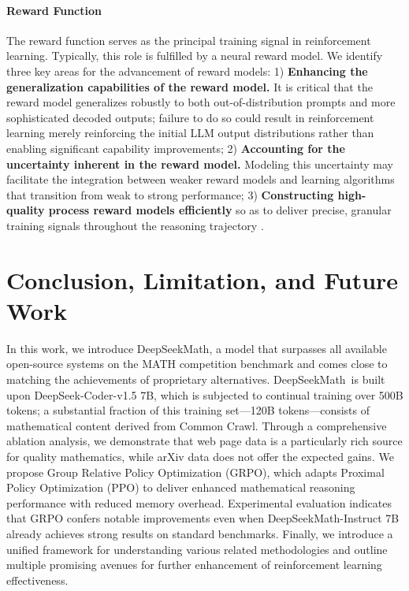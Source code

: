 \begin{itemize}[topsep=0pt]
\paragraph{Reward Function} The reward function serves as the principal training signal in reinforcement learning. Typically, this role is fulfilled by a neural reward model. We identify three key areas for the advancement of reward models: 1) \textbf{Enhancing the generalization capabilities of the reward model.} It is critical that the reward model generalizes robustly to both out-of-distribution prompts and more sophisticated decoded outputs; failure to do so could result in reinforcement learning merely reinforcing the initial LLM output distributions rather than enabling significant capability improvements; 2) \textbf{Accounting for the uncertainty inherent in the reward model.} Modeling this uncertainty may facilitate the integration between weaker reward models and learning algorithms that transition from weak to strong performance; 3) \textbf{Constructing high-quality process reward models efficiently} so as to deliver precise, granular training signals throughout the reasoning trajectory \citep{lightman2023let,wang2023math}.

\section{Conclusion, Limitation, and Future Work}

In this work, we introduce DeepSeekMath, a model that surpasses all available open-source systems on the MATH competition benchmark and comes close to matching the achievements of proprietary alternatives. DeepSeekMath~is built upon DeepSeek-Coder-v1.5 7B, which is subjected to continual training over 500B tokens; a substantial fraction of this training set—120B tokens—consists of mathematical content derived from Common Crawl. Through a comprehensive ablation analysis, we demonstrate that web page data is a particularly rich source for quality mathematics, while arXiv data does not offer the expected gains. We propose Group Relative Policy Optimization (GRPO), which adapts Proximal Policy Optimization (PPO) to deliver enhanced mathematical reasoning performance with reduced memory overhead. Experimental evaluation indicates that GRPO confers notable improvements even when DeepSeekMath-Instruct 7B already achieves strong results on standard benchmarks. Finally, we introduce a unified framework for understanding various related methodologies and outline multiple promising avenues for further enhancement of reinforcement learning effectiveness.


\end{itemize}
